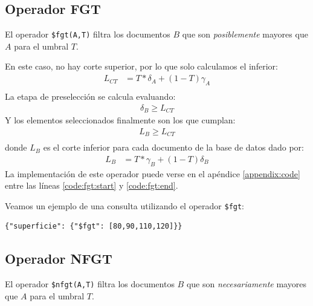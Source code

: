 \subsection{Operador FGT}

El operador \texttt{\$fgt(A,T)} filtra los documentos $B$ que son \textit{posiblemente} mayores que $A$ para el umbral $T$.

En este caso, no hay corte superior, por lo que solo calculamos el inferior:
%
\begin{align*}
    L_{CT} &= T * \delta_A + (1-T)\gamma_A \\
\end{align*}
%
La etapa de preselección se calcula evaluando:
%
\begin{align*}
    \delta_B \geq L_{CT}
\end{align*}
%
Y los elementos seleccionados finalmente son los que cumplan:
%
\begin{align*}
    L_B \geq L_{CT} \\
\end{align*}
%
donde $L_B$ es el corte inferior para cada documento de la base de datos dado por:
%
\begin{align*}
    L_B &= T * \gamma_B + (1-T)\delta_B
\end{align*}
%
La implementación de este operador puede verse en el apéndice \ref{appendix:code} entre las líneas \ref{code:fgt:start} y \ref{code:fgt:end}.

\begin{example}
Veamos un ejemplo de una consulta utilizando el operador \texttt{\$fgt}:
%
\begin{verbatim}
{"superficie": {"$fgt": [80,90,110,120]}}
\end{verbatim}

\end{example}

\subsection{Operador NFGT}

El operador \texttt{\$nfgt(A,T)} filtra los documentos $B$ que son \textit{necesariamente} mayores que $A$ para el umbral $T$.

